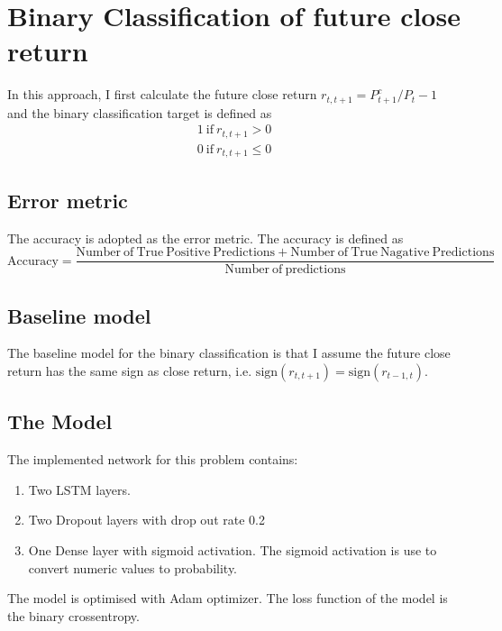 \documentclass[a4paper, 11pt, usenatbib]{article}
\begin{document}
\section{Binary Classification of future close return}
In this approach, I first calculate the future close return  $r_{t, t+1} = P_{t+1}^c / P_t - 1$ and the binary classification target is defined as
\begin{align*}
 1\ \mathrm{if} \ r_{t, t+1} > 0\\
 0\ \mathrm{if}\ r_{t, t+1} \le 0
\end{align*}

\subsection{Error metric}
The accuracy is adopted as the error metric. The accuracy is defined as
\begin{equation}
\mathrm{Accuracy} = \frac{\mathrm{Number\ of\ True\ Positive\ Predictions} + \mathrm{Number\ of\ True\ Nagative\ Predictions}} {\mathrm{Number\ of\ predictions}}
\end{equation}

\subsection{Baseline model}
The baseline model for the binary classification is that I assume the future close return has the same sign as close return, i.e. $\mathrm{sign}( r_{t, t+1})  = \mathrm{sign}(r_{t-1, t}) $.\\

\subsection{The Model}
The implemented network for this problem contains:
\begin{enumerate}
\item Two LSTM layers.
\item Two Dropout layers with drop out rate 0.2
\item One Dense layer with sigmoid activation. The sigmoid activation is use to convert numeric values to probability.
\end{enumerate}

The model is optimised with Adam optimizer. The loss function of the model is the binary crossentropy.
\end{document}
